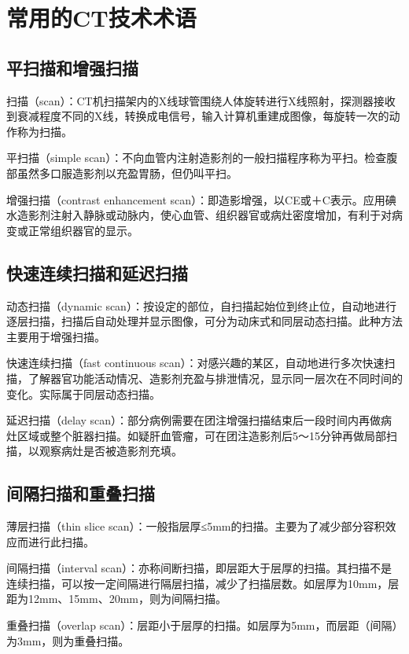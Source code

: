 \section{常用的CT技术术语}

\subsection{平扫描和增强扫描}

扫描（scan）：CT机扫描架内的X线球管围绕人体旋转进行X线照射，探测器接收到衰减程度不同的X线，转换成电信号，输入计算机重建成图像，每旋转一次的动作称为扫描。

平扫描（simple
scan）：不向血管内注射造影剂的一般扫描程序称为平扫。检查腹部虽然多口服造影剂以充盈胃肠，但仍叫平扫。

增强扫描（contrast enhancement
scan）：即造影增强，以CE或＋C表示。应用碘水造影剂注射入静脉或动脉内，使心血管、组织器官或病灶密度增加，有利于对病变或正常组织器官的显示。

\subsection{快速连续扫描和延迟扫描}

动态扫描（dynamic
scan）：按设定的部位，自扫描起始位到终止位，自动地进行逐层扫描，扫描后自动处理并显示图像，可分为动床式和同层动态扫描。此种方法主要用于增强扫描。

快速连续扫描（fast continuous
scan）：对感兴趣的某区，自动地进行多次快速扫描，了解器官功能活动情况、造影剂充盈与排泄情况，显示同一层次在不同时间的变化。实际属于同层动态扫描。

延迟扫描（delay
scan）：部分病例需要在团注增强扫描结束后一段时间内再做病灶区域或整个脏器扫描。如疑肝血管瘤，可在团注造影剂后5～15分钟再做局部扫描，以观察病灶是否被造影剂充填。

\subsection{间隔扫描和重叠扫描}

薄层扫描（thin slice
scan）：一般指层厚≤5mm的扫描。主要为了减少部分容积效应而进行此扫描。

间隔扫描（interval
scan）：亦称间断扫描，即层距大于层厚的扫描。其扫描不是连续扫描，可以按一定间隔进行隔层扫描，减少了扫描层数。如层厚为10mm，层距为12mm、15mm、20mm，则为间隔扫描。

重叠扫描（overlap
scan）：层距小于层厚的扫描。如层厚为5mm，而层距（间隔）为3mm，则为重叠扫描。

